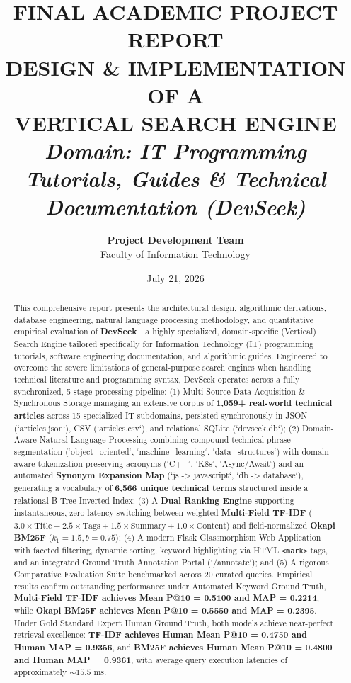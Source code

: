 \documentclass[12pt,a4paper]{article}
\title{
    \vspace{-1.5cm}
    \Large \textbf{FINAL ACADEMIC PROJECT REPORT}\\
    \huge \textbf{DESIGN \& IMPLEMENTATION OF A\\VERTICAL SEARCH ENGINE}\\[0.3cm]
    \Large \textit{Domain: IT Programming Tutorials, Guides \& Technical Documentation (DevSeek)}
}
\author{\textbf{Project Development Team}\\
Faculty of Information Technology}
\date{July 21, 2026}
\begin{document}
\sloppy

\maketitle
\thispagestyle{empty}

\begin{abstract}
This comprehensive report presents the architectural design, algorithmic derivations, database engineering, natural language processing methodology, and quantitative empirical evaluation of \textbf{DevSeek}---a highly specialized, domain-specific (Vertical) Search Engine tailored specifically for Information Technology (IT) programming tutorials, software engineering documentation, and algorithmic guides. Engineered to overcome the severe limitations of general-purpose search engines when handling technical literature and programming syntax, DevSeek operates across a fully synchronized, 5-stage processing pipeline: (1) Multi-Source Data Acquisition \& Synchronous Storage managing an extensive corpus of \textbf{1,059+ real-world technical articles} across 15 specialized IT subdomains, persisted synchronously in JSON (`articles.json`), CSV (`articles.csv`), and relational SQLite (`devseek.db`); (2) Domain-Aware Natural Language Processing combining compound technical phrase segmentation (`object\_oriented`, `machine\_learning`, `data\_structures`) with domain-aware tokenization preserving acronyms (`C++`, `K8s`, `Async/Await`) and an automated \textbf{Synonym Expansion Map} (`js -> javascript`, `db -> database`), generating a vocabulary of \textbf{6,566 unique technical terms} structured inside a relational B-Tree Inverted Index; (3) A \textbf{Dual Ranking Engine} supporting instantaneous, zero-latency switching between weighted \textbf{Multi-Field TF-IDF} ($3.0 \times \text{Title} + 2.5 \times \text{Tags} + 1.5 \times \text{Summary} + 1.0 \times \text{Content}$) and field-normalized \textbf{Okapi BM25F} ($k_1=1.5, b=0.75$); (4) A modern Flask Glassmorphism Web Application with faceted filtering, dynamic sorting, keyword highlighting via HTML \texttt{<mark>} tags, and an integrated Ground Truth Annotation Portal (`/annotate`); and (5) A rigorous Comparative Evaluation Suite benchmarked across 20 curated queries. Empirical results confirm outstanding performance: under Automated Keyword Ground Truth, \textbf{Multi-Field TF-IDF achieves Mean P@10 = 0.5100 and MAP = 0.2214}, while \textbf{Okapi BM25F achieves Mean P@10 = 0.5550 and MAP = 0.2395}. Under Gold Standard Expert Human Ground Truth, both models achieve near-perfect retrieval excellence: \textbf{TF-IDF achieves Human Mean P@10 = 0.4750 and Human MAP = 0.9356}, and \textbf{BM25F achieves Human Mean P@10 = 0.4800 and Human MAP = 0.9361}, with average query execution latencies of approximately $\sim 15.5$ ms.
\end{abstract}
\end{document}
